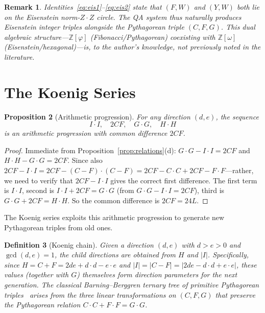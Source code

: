 \documentclass[11pt]{article}
\newtheorem{definition}{Definition}[section]
\newtheorem{proposition}[definition]{Proposition}
\newtheorem{remark}[definition]{Remark}
\begin{document}
\begin{remark}
Identities~\eqref{eq:eis1}--\eqref{eq:eis2} state that $(F, W)$ and $(Y, W)$ both lie on the Eisenstein norm-$Z\cdot Z$ circle.  The QA system thus naturally produces Eisenstein integer triples alongside the Pythagorean triple $(C, F, G)$.  This dual algebraic structure---$\mathbb{Z}[\varphi]$ (Fibonacci/Pythagorean) coexisting with $\mathbb{Z}[\omega]$ (Eisenstein/hexagonal)---is, to the author's knowledge, not previously noted in the literature.
\end{remark}

\section{The Koenig Series}\label{sec:koenig}

\begin{proposition}[Arithmetic progression]\label{prop:ap}
For any direction $(d,e)$, the sequence
\[
  I\cdot I, \quad 2CF, \quad G\cdot G, \quad H\cdot H
\]
is an arithmetic progression with common difference $2CF$.
\end{proposition}

\begin{proof}
Immediate from Proposition~\ref{prop:relations}(d): $G\cdot G - I\cdot I = 2CF$ and $H\cdot H - G\cdot G = 2CF$.  Since also $2CF - I\cdot I = 2CF - (C-F)\cdot(C-F) = 2CF - C\cdot C + 2CF - F\cdot F$---rather, we need to verify that $2CF - I\cdot I$ gives the correct first difference.  The first term is $I\cdot I$, second is $I\cdot I + 2CF = G\cdot G$ (from $G\cdot G - I\cdot I = 2CF$), third is $G\cdot G + 2CF = H\cdot H$.  So the common difference is $2CF = 24L$.
\end{proof}

The Koenig series exploits this arithmetic progression to generate new Pythagorean triples from old ones.

\begin{definition}[Koenig chain]
Given a direction $(d,e)$ with $d > e > 0$ and $\gcd(d,e)=1$, the \emph{child directions} are obtained from $H$ and $|I|$.  Specifically, since $H = C + F = 2de + d\cdot d - e\cdot e$ and $|I| = |C - F| = |2de - d\cdot d + e\cdot e|$, these values (together with $G$) themselves form direction parameters for the next generation.  The classical Barning--Berggren ternary tree of primitive Pythagorean triples~\cite{barning1963,berggren1934} arises from the three linear transformations on $(C, F, G)$ that preserve the Pythagorean relation $C\cdot C + F\cdot F = G\cdot G$.
\end{definition}
\end{document}
